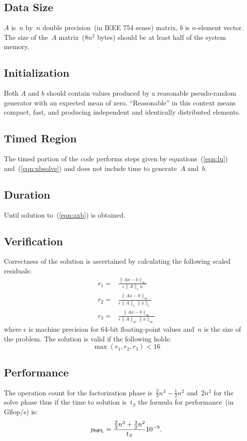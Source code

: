 \documentclass[twocolumn]{article}
\newcommand{\hpl}{\textsf{\scriptsize HPL}\xspace}
\begin{document}
\subsection{Data Size}
$A$ is~$n$ by~$n$ double precision~(in IEEE 754 sense) matrix, $b$ is
$n$-element vector. The size of the~$A$ matrix~($8n^2$ bytes) should be at
least half of the system memory.

\subsection{Initialization}
Both $A$ and $b$ should contain values produced by a reasonable pseudo-random
generator with an expected mean of zero. ``Reasonable'' in this context means
compact, fast, and producing independent and identically distributed elements.

\subsection{Timed Region}
The timed portion of the code performs steps given by equations~(\ref{eqn:lu})
and~(\ref{eqn:ubsolve}) and does not include time to generate~$A$ and~$b$.

\subsection{Duration}
Until solution to~(\ref{eqn:axb}) is obtained.

\subsection{Verification}
Correctness of the solution is ascertained by calculating the following scaled
residuals:
\begin{eqnarray}
r_1 = & \frac{\|Ax-b\|_{\infty}}{\epsilon \|A\|_1 n} \\
r_2 = &\frac{\|Ax-b\|_{\infty}}{\epsilon \|A\|_1 \|x\|_1} \\
r_3 = &\frac{\|Ax-b\|_{\infty}}{\epsilon \|A\|_{\infty} \|x\|_{\infty}}
\end{eqnarray}
where $\epsilon$ is machine precision for 64-bit floating-point values and~$n$
is the size of the problem. The solution is valid if the following holds:
\begin{equation}
  \max(r_1, r_2, r_3) < 16
\end{equation}

\subsection{Performance}
The operation count for the factorization phase
is~$\frac{2}{3}n^3-\frac{1}{2}n^2$ and~$2n^2$ for the solve phase thus if the
time to solution is~$t_S$ the formula for performance~(in Gflop/s) is:
\begin{equation}
  p_{\hpl}=\frac{\frac{2}{3}n^3+\frac{3}{2}n^2}{t_S}10^{-9}.
\end{equation}
\end{document}
